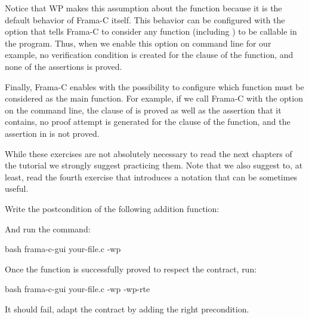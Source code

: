 

Notice that WP makes this assumption about the  function
because it is the default behavior of Frama-C itself. This behavior can be
configured with the option  that tells Frama-C to
consider any function (including ) to be callable in the
program. Thus, when we enable this option on command line for our example, no
verification condition is created for the  clause of the
 function, and none of the assertions is proved.




Finally, Frama-C enables with the possibility to configure which function
must be considered as the main function. For example, if we call Frama-C with
the option  on the command line, the 
clause of  is proved as well as the assertion that it contains,
no proof attempt is generated for the  clause of the
 function, and the assertion in  is not
proved.







While these exercises are not absolutely necessary to read the next chapters
of the tutorial we strongly suggest practicing them. Note that we also
suggest to, at least, read the fourth exercise that introduces a notation
that can be sometimes useful.





Write the postcondition of the following addition function:




And run the command:


\begin{CodeBlock}{bash}
frama-c-gui your-file.c -wp
\end{CodeBlock}


Once the function is successfully proved to respect the contract, run:


\begin{CodeBlock}{bash}
frama-c-gui your-file.c -wp -wp-rte
\end{CodeBlock}


It should fail, adapt the contract by adding the right precondition.


